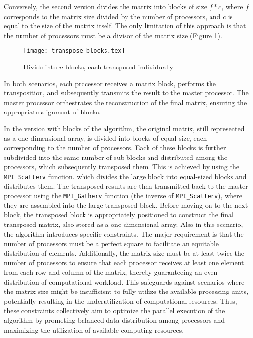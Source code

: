 Conversely, the second version divides the matrix into blocks of size $f * c$, where $f$ corresponds to the matrix %
size divided by the number of processors, and $c$ is equal to the size of the matrix itself. The only limitation %
of this approach is that the number of processors must be a divisor of the matrix size (Figure \ref{image:transpose-blocks}).

\begin{figure}[h]
    \caption{\label{image:transpose-blocks}Divide into $n$ blocks, each transposed individually}
    \centering
    \texttt{[image: transpose-blocks.tex]}
\end{figure}

In both scenarios, each processor receives a matrix block, performs the transposition, and subsequently transmits the %
result to the master processor. The master processor orchestrates the reconstruction of the final matrix, ensuring the %
appropriate alignment of blocks.

In the version with blocks of the algorithm, the original matrix, still represented as a one-dimensional array, is divided %
into blocks of equal size, each corresponding to the number of processors. Each of these blocks is further subdivided %
into the same number of sub-blocks and distributed among the processors, which subsequently transposed them.
This is achieved by using the \texttt{MPI\_Scatterv} function, which divides the large block into equal-sized blocks and distributes them.
The transposed results are then transmitted back to the master processor using the \texttt{MPI\_Gatherv} function (the inverse of %
\texttt{MPI\_Scatterv}), where they are assembled into the large transposed block.
Before moving on to the next block, the transposed block is appropriately positioned to construct the final transposed %
matrix, also stored as a one-dimensional array. 
Also in this scenario, the algorithm introduces specific constraints. The major requirement is that the number of processors must be %
a perfect square to facilitate an equitable distribution of elements. Additionally, the matrix size must be at least twice the number %
of processors to ensure that each processor receives at least one element from each row and column of the matrix, thereby guaranteeing %
an even distribution of computational workload. This safeguards against scenarios where the matrix size might be insufficient to fully %
utilize the available processing units, potentially resulting in the underutilization of computational resources. Thus, these constraints %
collectively aim to optimize the parallel execution of the algorithm by promoting balanced data distribution among processors and %
maximizing the utilization of available computing resources.


